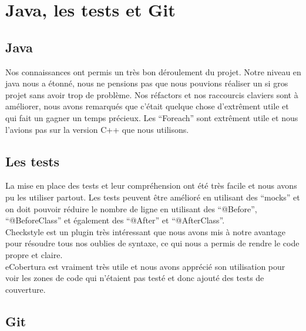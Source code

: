 \documentclass[12pt]{article}
\begin{document}
\newpage
\section{Java, les tests et Git}
\subsection{Java}

Nos connaissances ont permis un très bon déroulement du projet. Notre niveau en java nous a étonné, nous ne pensions pas que nous pouvions réaliser un si gros projet sans avoir trop de problème. Nos réfactors et nos raccourcis claviers sont à améliorer, nous avons remarqués que c'était quelque chose d'extrêment utile et qui fait un gagner un temps précieux. Les ``Foreach'' sont extrêment utile et nous l'avions pas sur la version C++ que nous utilisons. 

\subsection{Les tests}

La mise en place des tests et leur compréhension ont été très facile et nous avons pu les utiliser partout. Les tests peuvent être amélioré en utilisant des ``mocks''  et on doit pouvoir réduire le nombre de ligne en utilisant des ``@Before'', ``@BeforeClass'' et également des ``@After'' et ``@AfterClass''.\\
Checkstyle est un plugin très intéressant que nous avons mis à notre avantage pour résoudre tous nos oublies de syntaxe, ce qui nous a permis de rendre le code propre et claire.\\
eCobertura est vraiment très utile et nous avons apprécié son utilisation pour voir les zones de code qui n'étaient pas testé et donc ajouté des tests de couverture.

\subsection{Git}
\end{document}
